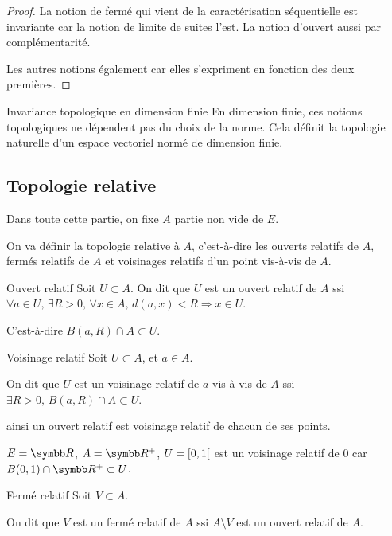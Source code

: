 \begin{proof}
    La notion de fermé qui vient de la caractérisation séquentielle est invariante car la notion de 
    limite de suites l'est. 
    La notion d'ouvert aussi par complémentarité. 

    Les autres notions également car elles s'expriment en fonction des deux premières.
\end{proof}


\begin{corollaire}{Invariance topologique en dimension finie}{}
    En dimension finie, ces notions topologiques ne dépendent pas du choix de la norme. Cela définit la topologie naturelle d'un espace vectoriel normé de dimension finie.
\end{corollaire}

\subsection{Topologie relative}

Dans toute cette partie, on fixe $A$ partie non vide de $E$.

On va définir la topologie relative à $A$, c'est-à-dire les ouverts relatifs de $A$, fermés relatifs de $A$ et voisinages relatifs d'un point vis-à-vis de $A$.

\begin{definition}{Ouvert relatif}{}
    Soit $U \subset A$. On dit que $U$ est un ouvert relatif de $A$ 
    ssi $\forall a \in U, \, \exists R > 0, \, \forall x \in A, \, d(a, x) < R \Rightarrow x \in U$.

    C'est-à-dire $B(a, R) \cap A \subset U$.
\end{definition}

\begin{definition}{Voisinage relatif}{}
    Soit $U \subset A$, et $a \in A$. 

    On dit que $U$ est un voisinage relatif de $a$ vis à vis de $A$ ssi 
    $\exists R > 0, \, B(a, R) \cap A \subset U$.

    ainsi un ouvert relatif est voisinage relatif de chacun de ses points.
\end{definition}

\begin{exemple}
    $E = \R$, $A = \R^+$, $U = \left[0, 1\right[$ est un voisinage relatif de $0$ 
    car $B(0, 1) \cap \R^+ \subset U$. 
\end{exemple}

\begin{definition}{Fermé relatif}{}
    Soit $V \subset A$. 

    On dit que $V$ est un fermé relatif de $A$ ssi $A \setminus V$ est un ouvert relatif de $A$.
\end{definition}

